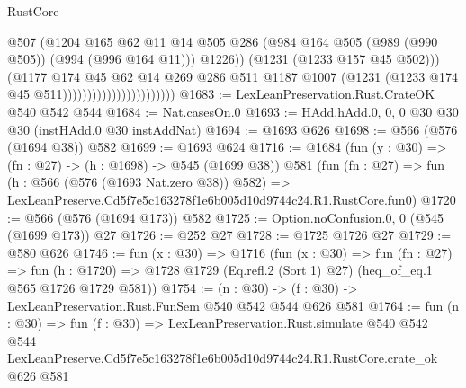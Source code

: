 \begin{lexlean}{RustCore}
\begin{coremodule}
                                                @507
                                                (@1204
                                                  @165
                                                  @62
                                                  @11
                                                  @14
                                                  @505
                                                  @286
                                                  (@984
                                                    @164
                                                    @505
                                                    (@989 (@990 @505))
                                                    (@994 (@996 @164 @11)))
                                                  @1226))
                                              (@1231 (@1233 @157 @45 @502)))
                                            (@1177
                                              @174
                                              @45
                                              @62
                                              @14
                                              @269
                                              @286
                                              @511
                                              @1187
                                              @1007
                                              (@1231 (@1233 @174 @45 @511)))))))))))))))))))))))
@1683 := LexLeanPreservation.Rust.CrateOK @540 @542 @544
@1684 := Nat.casesOn.{0}
@1693 := HAdd.hAdd.{0, 0, 0} @30 @30 @30 (instHAdd.{0} @30 instAddNat)
@1694 := @1693 @626
@1698 := @566 (@576 (@1694 @38)) @582
@1699 := @1693 @624
@1716 := @1684
    (fun (y : @30) => (fn : @27) -> (h : @1698) -> @545 (@1699 @38))
    @581
    (fun (fn : @27) =>
    fun (h : @566 (@576 (@1693 Nat.zero @38)) @582) =>
    LexLeanPreserve.Cd5f7e5c163278f1e6b005d10d9744c24.R1.RustCore.fun0)
@1720 := @566 (@576 (@1694 @173)) @582
@1725 := Option.noConfusion.{0, 0} (@545 (@1699 @173)) @27
@1726 := @252 @27
@1728 := @1725 @1726 @27
@1729 := @580 @626
@1746 := fun (x : @30) =>
  @1716
    (fun (x : @30) =>
    fun (fn : @27) =>
    fun (h : @1720) => @1728 @1729 (Eq.refl.{2} (Sort 1) @27) (heq_of_eq.{1} @565 @1726 @1729 @581))
@1754 := (n : @30) -> (f : @30) -> LexLeanPreservation.Rust.FunSem @540 @542 @544 @626 @581
@1764 := fun (n : @30) =>
  fun (f : @30) =>
  LexLeanPreservation.Rust.simulate
    @540
    @542
    @544
    LexLeanPreserve.Cd5f7e5c163278f1e6b005d10d9744c24.R1.RustCore.crate_ok
    @626
    @581
\end{coremodule}
\end{lexlean}
